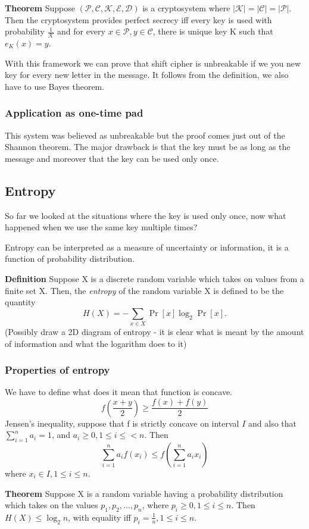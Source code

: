 \documentclass[a4paper,10pt]{article}
\newcommand{\mc}[1]{\ensuremath{\mathcal{#1}}}
\begin{document}
\noindent
\textbf{Theorem} Suppose $(\mc{P},\mc{C},\mc{K},\mc{E},\mc{D})$ is a cryptosystem where $|\mc{K}| = |\mc{C}| = |\mc{P}|$. Then the cryptosystem provides perfect secrecy iff every key is used with probability $\frac{1}{\mc{K}}$ and for every $x \in \mc{P}, y \in \mc{C}$, there is unique key K such that $e_K(x) = y$.

With this framework we can prove that shift cipher is unbreakable if we you new key for every new letter in the message. It follows from the definition, we also have to use Bayes theorem.
\subsubsection*{Application as one-time pad}
This system was believed as unbreakable but the proof comes just out of the Shannon theorem. The major drawback is that the key must be as long as the message and moreover that the key can be used only once. 

\subsection*{Entropy}
So far we looked at the situations where the key is used only once, now what happened when we use the same key multiple times?

Entropy can be interpreted as a measure of uncertainty or information, it is a function of probability distribution.

\noindent
\textbf{Definition}
Suppose X is a discrete random variable which takes on values from a finite set X. Then, the \textit{entropy} of the random variable X is defined to be the quantity
$$
H(X) = -\sum_{x\in X} \Pr[x]\log_2\Pr[x].
$$
(Possibly draw a 2D diagram of entropy - it is clear what is meant by the amount of information and what the logarithm does to it)

\subsubsection*{Properties of entropy}
We have to define what does it mean that function is concave.
$$
f\left( \frac{x+y}{2} \right) \geq \frac{f(x)+f(y)}{2}
$$
Jensen's inequality, suppose that f is strictly concave on interval $ I $ and also that $\sum_{i=1}^n a_i = 1$, and $a_i \geq 0, 1 \leq i \leq < n$. Then
$$
\sum_{i=1}^n a_i f(x_i) \leq f \left( \sum_{i=1}^n a_i x_i \right)
$$
where $x_i \in I, 1\leq i \leq n$.

\noindent
\textbf{Theorem} Suppose X is a random variable having a probability distribution which takes on the values $p_1,p_2,...,p_n$, where $ p_i \ge 0,1 \leq i \leq n$. Then $H(X) \leq \log_2 n$, with equality iff $p_i = \frac{1}{n},1 \leq i \leq n$.
\end{document}
